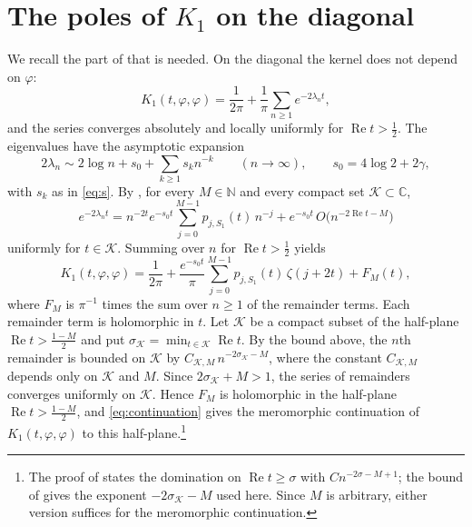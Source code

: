 \documentclass[11pt]{amsart}
\theoremstyle{definition}
\theoremstyle{remark}
\numberwithin{equation}{section}
\newcommand{\N}{\mathbb{N}}
\newcommand{\C}{\mathbb{C}}
\begin{document}
\section{The poles of \texorpdfstring{$K_1$}{K1} on the diagonal}\label{sec:kernel}

We recall the part of \cite[Proposition~2.8]{RS} that is needed. On the diagonal the kernel does not depend on $\varphi$:
\begin{equation}\label{eq:diag}
  K_1(t,\varphi,\varphi)=\frac1{2\pi}+\frac1\pi\sum_{n\ge1}e^{-2\lambda_nt},
\end{equation}
and the series converges absolutely and locally uniformly for $\operatorname{Re}t>\frac12$. The eigenvalues have the asymptotic expansion \cite[(2.21)]{RS}
\[
  2\lambda_n\sim2\log n+s_0+\sum_{k\ge1}s_kn^{-k}\qquad(n\to\infty),\qquad s_0=4\log2+2\gamma,
\]
with $s_k$ as in \eqref{eq:s}. By \cite[Lemma~2.1, (2.1)]{RS}, for every $M\in\N$ and every compact set $\mathcal K\subset\C$,
\[
  e^{-2\lambda_nt}=n^{-2t}e^{-s_0t}\sum_{j=0}^{M-1}p_{j,S_1}(t)\,n^{-j}+e^{-s_0t}\,O\bigl(n^{-2\operatorname{Re}t-M}\bigr)
\]
uniformly for $t\in\mathcal K$. Summing over $n$ for $\operatorname{Re}t>\frac12$ yields \cite[(2.19)]{RS}
\begin{equation}\label{eq:continuation}
  K_1(t,\varphi,\varphi)=\frac1{2\pi}+\frac{e^{-s_0t}}{\pi}\sum_{j=0}^{M-1}p_{j,S_1}(t)\,\zeta(j+2t)+F_M(t),
\end{equation}
where $F_M$ is $\pi^{-1}$ times the sum over $n\ge1$ of the remainder terms. Each remainder term is holomorphic in $t$. Let $\mathcal K$ be a compact subset of the half-plane $\operatorname{Re}t>\frac{1-M}2$ and put $\sigma_{\mathcal K}=\min_{t\in\mathcal K}\operatorname{Re}t$. By the bound above, the $n$th remainder is bounded on $\mathcal K$ by $C_{\mathcal K,M}\,n^{-2\sigma_{\mathcal K}-M}$, where the constant $C_{\mathcal K,M}$ depends only on $\mathcal K$ and $M$. Since $2\sigma_{\mathcal K}+M>1$, the series of remainders converges uniformly on $\mathcal K$. Hence $F_M$ is holomorphic in the half-plane $\operatorname{Re}t>\frac{1-M}2$, and \eqref{eq:continuation} gives the meromorphic continuation of $K_1(t,\varphi,\varphi)$ to this half-plane.\footnote{The proof of \cite[Proposition~2.8]{RS} states the domination on $\operatorname{Re}t\ge\sigma$ with $Cn^{-2\sigma-M+1}$; the bound of \cite[(2.1)]{RS} gives the exponent $-2\sigma_{\mathcal K}-M$ used here. Since $M$ is arbitrary, either version suffices for the meromorphic continuation.}
\end{document}
